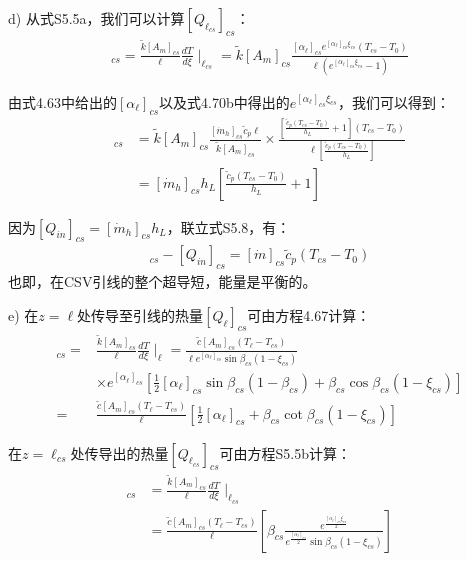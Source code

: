 d) 从式S5.5a，我们可以计算$[Q_{\ell_{cs}}]_{cs}$：
\begin{align*}
[Q_{\ell_{cs}}]_{cs}=\frac{\tilde{k}[A_m]_{cs}}{\ell}\frac{dT}{d\xi}\mid_{\ell_{cs}} 
=\tilde{k}[A_m]_{cs}\frac{[\alpha_\ell]_{cs}e^{[\alpha_\ell]_{cs}\xi_{cs}}(T_{cs}-T_0)}{\ell(e^{[\alpha_\ell]_{cs}\xi_{cs}}-1)} \tag{S5.7}
\end{align*}

由式4.63中给出的$[\alpha_\ell]_{cs}$以及式4.70b中得出的$e^{[\alpha_\ell]_{cs}\xi_{cs}}$，我们可以得到：
\begin{align*}
[Q_{\ell_{cs}}]_{cs}&=\tilde{k}[A_m]_{cs}\frac{[\dot{m}_h]_{cs}\tilde{c}_p\ell}{\tilde{k}[A_m]_{cs}}\times\frac{\left[ \frac{\tilde{c}_p(T_{cs}-T_0)}{h_L}+1\right] (T_{cs}-T_0)}{\ell\left[\frac{\tilde{c}_p(T_{cs}-T_0)}{h_L}\right]} \\
&=[\dot{m}_h]_{cs}h_L\left[ \frac{\tilde{c}_p(T_{cs}-T_0)}{h_L}+1\right] \tag{S5.8}
\end{align*}

因为$[Q_{in}]_{cs}=[\dot{m}_h]_{cs} h_L$，联立式S5.8，有：
\begin{align*}%
[Q_{\ell_{cs}}]_{cs}-[Q_{in}]_{cs}=[\dot{m}]_{cs}\tilde{c}_p(T_{cs}-T_0) \tag{4.72}
\end{align*}
也即，在CSV引线的整个超导短，能量是平衡的。

e) 在$z=\ell$处传导至引线的热量$[Q_\ell]_{cs}$可由方程4.67计算：
\begin{align*}
[Q_\ell]_{cs}=&\frac{\tilde{k}[A_m]_{cs}}{\ell}\frac{dT}{d\xi}\mid_\ell=\frac{\tilde{c}[A_m]_{cs}(T_\ell-T_{cs})}{\ell e^{[\alpha_\ell]_{cs}}\sin\beta_{cs}(1-\xi_{cs})} \\
&\times e^{[\alpha_\ell]_{cs}}[\frac{1}{2}[\alpha_\ell]_{cs}\sin\beta_{cs}(1-\beta_{cs})+\beta_{cs}\cos\beta_{cs}(1-\xi_{cs})] \\
=&\frac{\tilde{c}[A_m]_{cs}(T_\ell-T_{cs})}{\ell}[\frac{1}{2}[\alpha_\ell]_{cs}+\beta_{cs}\cot\beta_{cs}(1-\xi_{cs})] \tag{S5.9}
\end{align*}

在$z=\ell_{cs}$处传导出的热量$[Q_{\ell_{cs}}]_{cs}$可由方程S5.5b计算：
\begin{align*}
[Q_{\ell_{cs}}]_{cs}&=\frac{\tilde{k}[A_m]_{cs}}{\ell}\frac{dT}{d\xi}\mid_{\ell_{cs}}\\
&=\frac{\tilde{c}[A_m]_{cs}(T_\ell-T_{cs})}{\ell}\left[\beta_{cs}\frac{e^{\frac{[\alpha_\ell]_{cs}\xi_{cs}}{2}}}{e^{\frac{[\alpha_\ell]_{cs}}{2}}\sin\beta_{cs}(1-\xi_{cs})}\right] \tag{S5.10}
\end{align*}

